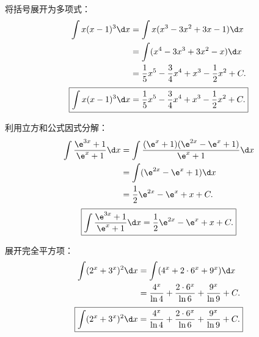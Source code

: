 \begin{solution}

    将括号展开为多项式：
    \begin{equation}
        \begin{aligned}
            \int x(x - 1)^3 \d x & = \int x(x^3 - 3x^2 + 3x - 1) \d x                            \\
                                 & = \int (x^4 - 3x^3 + 3x^2 - x) \d x                           \\
                                 & = \frac{1}{5}x^5 - \frac{3}{4}x^4 + x^3 - \frac{1}{2}x^2 + C.
        \end{aligned}
    \end{equation}
    \begin{equation}
        \boxed{\int x(x - 1)^3 \d x = \frac{1}{5}x^5 - \frac{3}{4}x^4 + x^3 - \frac{1}{2}x^2 + C.}
    \end{equation}


    利用立方和公式因式分解：
    \begin{equation}
        \begin{aligned}
            \int \frac{\e^{3x} + 1}{\e^x + 1} \d x & = \int \frac{(\e^x + 1)(\e^{2x} - \e^x + 1)}{\e^x + 1} \d x \\
                                                   & = \int (\e^{2x} - \e^x + 1) \d x                            \\
                                                   & = \frac{1}{2}\e^{2x} - \e^x + x + C.
        \end{aligned}
    \end{equation}
    \begin{equation}
        \boxed{\int \frac{\e^{3x} + 1}{\e^x + 1} \d x = \frac{1}{2}\e^{2x} - \e^x + x + C.}
    \end{equation}


    展开完全平方项：
    \begin{equation}
        \begin{aligned}
            \int (2^x + 3^x)^2 \d x & = \int (4^x + 2 \cdot 6^x + 9^x) \d x                                    \\
                                    & = \frac{4^x}{\ln 4} + \frac{2 \cdot 6^x}{\ln 6} + \frac{9^x}{\ln 9} + C.
        \end{aligned}
    \end{equation}
    \begin{equation}
        \boxed{\int (2^x + 3^x)^2 \d x = \frac{4^x}{\ln 4} + \frac{2 \cdot 6^x}{\ln 6} + \frac{9^x}{\ln 9} + C.}
    \end{equation}


\end{solution}
